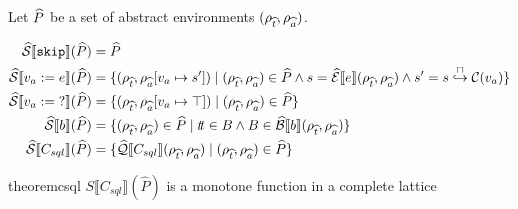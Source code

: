 Let $\widehat{P}$ be a set of abstract environments $(\rho_{\widehat{t}}, \rho_{\widehat{a}})$.

\begin{align}
    \widehat{\mathcal{S}} \llbracket \texttt{skip} \rrbracket(\widehat{P}) &= \widehat{P} \\
    \widehat{\mathcal{S}} \llbracket v_a := e \rrbracket(\widehat{P}) &= \{(\rho_{\widehat{t}}, \rho_{\widehat{a}}[v_a \mapsto s']) \mid (\rho_{\widehat{t}}, \rho_{\widehat{a}}) \in \widehat{P} \land s = \widehat{\mathcal{E}}\llbracket e \rrbracket(\rho_{\widehat{t}}, \rho_{\widehat{a}}) \land s' = s \overset{\sqcap}{\hookrightarrow} \mathcal{C}(v_a) \} \\
    \widehat{\mathcal{S}} \llbracket v_a := \; ? \rrbracket(\widehat{P}) &= \{(\rho_{\widehat{t}}, \rho_{\widehat{a}}[v_a \mapsto \top]) \mid (\rho_{\widehat{t}}, \rho_{\widehat{a}}) \in \widehat{P} \} \\
    \widehat{\mathcal{S}} \llbracket b \rrbracket(\widehat{P}) &= \{ (\rho_{\widehat{t}}, \rho_{\widehat{a}}) \in \widehat{P} \mid t\!t \in B \land B \in \widehat{\mathcal{B}}\llbracket b \rrbracket(\rho_{\widehat{t}}, \rho_{\widehat{a}}) \} \\
    \widehat{\mathcal{S}} \llbracket C_{sql} \rrbracket(\widehat{P}) &= \{\widehat{\mathcal{Q}}\llbracket C_{sql} \rrbracket(\rho_{\widehat{t}}, \rho_{\widehat{a}}) \mid (\rho_{\widehat{t}}, \rho_{\widehat{a}}) \in \widehat{P} \}
\end{align}

\begin{restatable}{theorem}{csql}\label{thm:csql}
    $S\llbracket C_{sql}\rrbracket(\widehat{P})$ is a monotone function in a complete lattice
\end{restatable}

